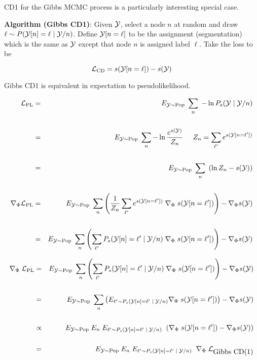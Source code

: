{

CD1 for the Gibbs MCMC process is a particularly interesting special case.

\vfill
{\bf Algorithm (Gibbs CD1)}: Given ${\cal Y}$, select a node $n$ at random and draw {\color{red} $\ell \sim P({\cal Y}[n]=\ell\;| \;{\cal Y}/n)$}. Define {\color{red} ${\cal Y}[n=\ell]$}
to be the assignment (segmentation) which is the same as ${\cal Y}$ except that node $n$ is assigned label $\ell$.  Take the loss to be

\vfill
{\color{red} $${\cal L}_{\mathrm{CD}}  = s({\cal Y}[n=\ell]) - s({\cal Y})$$}


Gibbs CD1 is equivalent in expectation to pseudolikelihood.

{\huge
\begin{eqnarray*}
{\cal L}_{\mathrm{PL}} & = & E_{{\cal Y} \sim \mathrm{Pop}}\;\sum_n \; - \ln P_s({\cal Y}\;|\;{\cal Y}/n) \\
\\
 & = & E_{{\cal Y} \sim \mathrm{Pop}}\;\sum_n -\ln \frac{e^{s({\cal Y})}}{Z_n}\;\;\;\;\;{Z_n = \sum_{\ell'} e^{s({\cal Y}[n=\ell'])}} \\
\\
& = & E_{{\cal Y} \sim \mathrm{Pop}}\;\sum_n\; \left(\ln Z_n - s({\cal Y})\right) \\
\\
\nabla_\Phi {\cal L}_{\mathrm{PL}} & = & E_{{\cal Y} \sim \mathrm{Pop}}\;\sum_n \left(\frac{1}{Z_n} \sum_{\ell'} e^{s({\cal Y}[n=\ell'])} \; \nabla_\Phi\;s({\cal Y}[n=\ell'])\right) - \nabla_\Phi s({\cal Y}) \\
\\
& = & E_{{\cal Y} \sim \mathrm{Pop}}\;\sum_n \left(\sum_{\ell'} P_s({\cal Y}[n]=\ell'\;|\;{\cal Y}/n) \; \nabla_\Phi\;s({\cal Y}[n=\ell'])\right) - \nabla_\Phi s({\cal Y})
\end{eqnarray*}
}


{\huge
\begin{eqnarray*}
\nabla_\Phi\;{\cal L}_{\mathrm{PL}} & = & E_{{\cal Y} \sim \mathrm{Pop}}\;\sum_n \left(\sum_{\ell'} P_s({\cal Y}[n]=\ell'\;|\;{\cal Y}/n)\; \nabla_\Phi\;s({\cal Y}[n=\ell'])\right) - \nabla_\Phi s({\cal Y}) \\
\\
& = & E_{{\cal Y} \sim \mathrm{Pop}}\;\sum_n \left(E_{\ell' \sim P_s({\cal Y}[n]=\ell'\;|\;{\cal Y}/n)} \nabla_\Phi\;s({\cal Y}[n=\ell'])\right) - \nabla_\Phi s({\cal Y}) \\
\\
& \propto & E_{{\cal Y} \sim \mathrm{Pop}}\;E_n\;  E_{\ell' \sim P_s({\cal Y}[n]=\ell'\;|\;{\cal Y}/n)}\;\; (\nabla_\Phi\;s({\cal Y}[n=\ell']) - \nabla_\Phi s({\cal Y})) \\
\\
& = & E_{{\cal Y} \sim \mathrm{Pop}}\;E_n\; E_{\ell' \sim P_s({\cal Y}[n]=\ell'\;|\;{\cal Y}/n)}\;\; \nabla_\Phi\;{\cal L}_{\mbox{Gibbs CD(1)}}
\end{eqnarray*}
}

}

